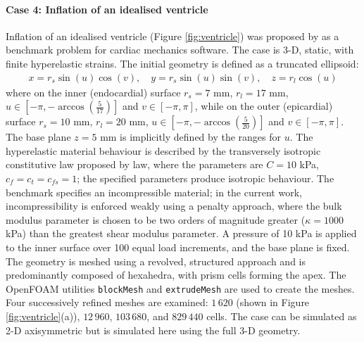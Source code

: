 \documentclass[sn-mathphys,Numbered]{sn-jnl}%
\begin{document}
\paragraph{Case 4: Inflation of an idealised ventricle}
Inflation of an idealised ventricle (Figure \ref{fig:ventricle}) was proposed by \citet{Land2015} as a benchmark problem for cardiac mechanics software.
The case is 3-D, static, with finite hyperelastic strains.
The initial geometry is defined as a truncated ellipsoid:
\begin{eqnarray}
	x = r_s \sin(u) \cos(v), \quad
	y = r_s \sin(u) \sin(v), \quad
	z = r_l \cos(u)
\end{eqnarray}
where on the inner (endocardial) surface $r_s =7$ mm, $r_l = 17$ mm, $u \in \left[-\pi, -\arccos \left( \frac{5}{17} \right) \right]$ and $v \in \left[-\pi, \pi \right]$, while on the outer (epicardial) surface $r_s =10$ mm, $r_l = 20$ mm, $u \in \left[-\pi, -\arccos \left( \frac{5}{20} \right) \right]$ and $v \in \left[-\pi, \pi \right]$.
The base plane $z = 5$ mm is implicitly defined by the ranges for $u$.
The hyperelastic material behaviour is described by the transversely isotropic constitutive law proposed by \citet{Guccione1995} law, where the parameters are $C = 10$ kPa, $c_f = c_t = c_{fs} = 1$; the specified parameters produce isotropic behaviour.
The benchmark specifies an incompressible material; in the current work, incompressibility is enforced weakly using a penalty approach, where the bulk modulus parameter is chosen to be two orders of magnitude greater ($\kappa = 1000$ kPa) than the greatest shear modulus parameter.
A pressure of 10 kPa is applied to the inner surface over 100 equal load increments, and the base plane is fixed.
The geometry is meshed using a revolved, structured approach and is predominantly composed of hexahedra, with prism cells forming the apex.
The OpenFOAM utilities \texttt{blockMesh} and \texttt{extrudeMesh} are used to create the meshes.
Four successively refined meshes are examined: $1\,620$ (shown in Figure \ref{fig:ventricle}(a)), $12\,960$, $103\,680$, and $829\,440$ cells.
The case can be simulated as 2-D axisymmetric but is simulated here using the full 3-D geometry.
\end{document}
